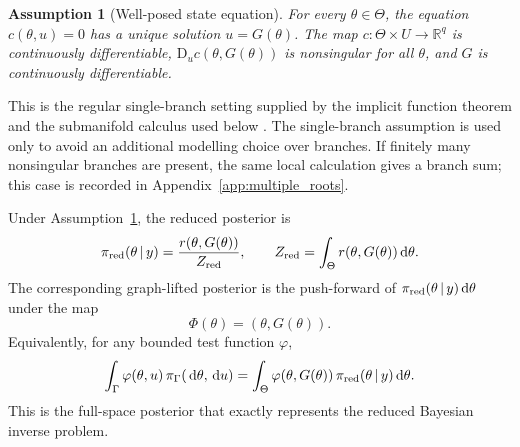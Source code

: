\documentclass[11pt]{article}
\newtheorem{assumption}{Assumption}
\newcommand{\R}{\mathbb{R}}
\newcommand{\dd}{\,\mathrm{d}}
\newcommand{\D}{\mathrm{D}}
\newcommand{\given}{\,|\,}
\begin{document}
\begin{assumption}[Well-posed state equation]
\label{ass:state}
For every \(\theta\in\Theta\), the equation \(c(\theta,u)=0\) has a unique solution \(u=G(\theta)\). The map \(c:\Theta\times U\to\R^q\) is continuously differentiable, \(\D_u c(\theta,G(\theta))\) is nonsingular for all \(\theta\), and \(G\) is continuously differentiable.
\end{assumption}
This is the regular single-branch setting supplied by the implicit function theorem and the submanifold calculus used below \cite{Lee2013}. The single-branch assumption is used only to avoid an additional modelling choice over branches. If finitely many nonsingular branches are present, the same local calculation gives a branch sum; this case is recorded in Appendix~\ref{app:multiple_roots}.

Under Assumption~\ref{ass:state}, the reduced posterior is
\begin{equation}
 \pi_{\rm red}(\theta\given y)
 =
 \frac{r(\theta,G(\theta))}{Z_{\rm red}},
 \qquad
 Z_{\rm red}=\int_\Theta r(\theta,G(\theta))\dd\theta .
 \label{eq:red_posterior}
\end{equation}
The corresponding graph-lifted posterior is the push-forward of \(\pi_{\rm red}(\theta\given y)\dd\theta\) under the map
\begin{equation}
 \Phi(\theta)=(\theta,G(\theta)).
\end{equation}
Equivalently, for any bounded test function \(\varphi\),
\begin{equation}
 \int_\Gamma \varphi(\theta,u)\,\pi_\Gamma(\dd\theta,\dd u)
 =
 \int_\Theta \varphi(\theta,G(\theta))\,
 \pi_{\rm red}(\theta\given y)\dd\theta .
 \label{eq:graph_pushforward}
\end{equation}
This is the full-space posterior that exactly represents the reduced Bayesian inverse problem.
\end{document}
